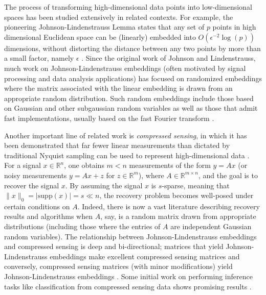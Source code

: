 \documentclass[twoside,11pt]{article}
\newcommand{\supp}{\mathrm{supp}}
\def \R {\mathbb{R}}
\newcommand{\edit}[1]{{{#1}}}
\begin{document}
The process of transforming high-dimensional data points into low-dimensional spaces has been studied extensively in related contexts. For example, the pioneering Johnson-Lindenstrauss Lemma states that any set of $p$ points in high dimensional Euclidean space can be (linearly) embedded into $O(\epsilon^{-2} \log(p))$ dimensions, without distorting the distance between any two points by more than a small factor, namely $\epsilon$  \citep{JohnsL_Extensions}. Since the original work of Johnson and Lindenstrauss, much work on Johnson-Lindenstrauss embeddings (often motivated by signal processing and data analysis applications) has focused on randomized embeddings where the matrix associated with the linear embedding is drawn from an appropriate random distribution. Such random embeddings include those based on Gaussian and other subgaussian random variables as well as those that admit fast implementations, usually based on the fast Fourier transform \citep{ailon2006approximate, achlioptas2003database, dasgupta2003elementary}. 

Another important line of related work is \textit{compressed sensing}, in which it has been demonstrated that far fewer linear measurements than dictated by traditional Nyquist sampling can be used to represent high-dimensional data  \citep{CandeRT_Stable,CandeRT_Robust,Donoh_Compressed}. For a signal $x\in\R^n$, one obtains $m<n$ measurements of the form $y = Ax$ (or noisy measurements $y=Ax+z$ for $z\in\R^m$), where $A\in\R^{m\times n}$, and the goal is to recover the signal $x$. By assuming the signal $x$ is $s$-sparse, meaning that $\| x\|_0 = |\supp(x)| = s \ll n$, the recovery problem becomes well-posed under certain conditions on $A$. Indeed, there is now a vast literature describing recovery results and algorithms when $A$, say, is a random matrix drawn from appropriate distributions (including those where the entries of $A$ are independent Gaussian random variables). The relationship between Johnson-Lindenstrauss embeddings and compressed sensing is deep and bi-directional; matrices that yield Johnson-Lindenstrauss embeddings make excellent compressed sensing matrices \citep{baraniuk2006johnson} and conversely, compressed sensing matrices (with minor modifications) yield Johnson-Lindenstrauss embeddings \citep{krahmer2011new}. \edit{Some initial work on performing inference tasks like classification from compressed sensing data shows promising results \citep{BoufoB_1Bit,hunter2010compressive,calderbank2009compressed,davenport2010signal,gupta2010sample,hahn2014adaptive}.}
\end{document}
